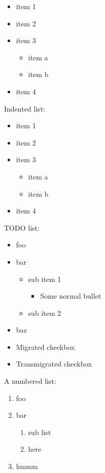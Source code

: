 \begin{itemize}
\item item 1
\item item 2
\item item 3
	\begin{itemize}
	\item item a
	\item item b
	\end{itemize}
\item item 4
\end{itemize}




Indented list:

	\begin{itemize}
	\item item 1
	\item item 2
	\item item 3
		\begin{itemize}
		\item item a
		\item item b
		\end{itemize}
	\item item 4
	\end{itemize}




TODO list:

\begin{itemize}
\item[\Square] foo
\item[\CheckedBox] bar
	\begin{itemize}
	\item[\CheckedBox] sub item 1
		\begin{itemize}
		\item Some normal bullet
		\end{itemize}
	\item[\CheckedBox] sub item 2
	\end{itemize}
\item[\XBox] baz
\end{itemize}


\begin{itemize}
\item[\RIGHTarrow] Migrated checkbox
\item[\LEFTarrow] Transmigrated checkbox
\end{itemize}


A numbered list:

\begin{enumerate}[1]
\item foo
\item bar
	\begin{enumerate}[a]
	\item sub list
	\item here
	\end{enumerate}
\item hmmm
\end{enumerate}




